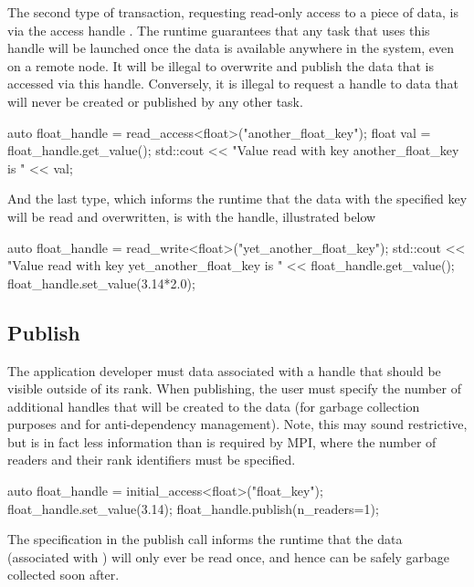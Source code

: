 The second type of transaction, requesting read-only access to a piece of data, is via the access handle . The runtime
guarantees that any task that uses this handle will be launched once the data is available anywhere in the system, even on a remote node.
It will be illegal to overwrite and publish the data that is accessed via this handle. Conversely, it is illegal to request a 
handle to data that will never be created or published by any other task.
\begin{CppCode}
auto float_handle = read_access<float>("another_float_key");
float val = float_handle.get_value();
std::cout << "Value read with key another_float_key is " << val;
\end{CppCode}

And the last type, which informs the runtime that the data with the specified key will be read and overwritten, is with the 
handle, illustrated below
\begin{CppCode}
auto float_handle = read_write<float>("yet_another_float_key");
std::cout << "Value read with key yet_another_float_key is " 
          << float_handle.get_value();
float_handle.set_value(3.14*2.0);
\end{CppCode}


\subsection{Publish}
\label{subsec:publish}
The application developer must data associated with a
handle that should be visible
outside of its \gls{rank}.  When publishing,  the user must specify the
number of additional handles that will be created to the data (for garbage
collection purposes and for \gls{anti-dependency} management).
Note, this may sound restrictive, but is in fact
less information than is required by \gls{MPI}, where the number of readers and
their \gls{rank} identifiers must be specified.

\begin{CppCode}
auto float_handle = initial_access<float>("float_key");
float_handle.set_value(3.14);
float_handle.publish(n_readers=1);
\end{CppCode}
The  specification in the publish call informs the
runtime that the data (associated with ) will
only ever be read once, and hence can be safely garbage collected soon after.

